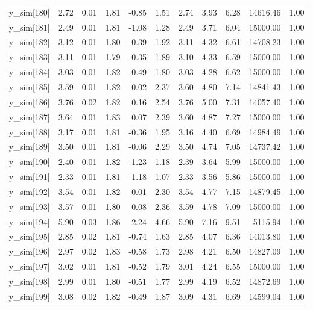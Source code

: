 \begin{table}[ht]
\begin{tabular}{rrrrrrrrrrr}
  y\_sim[180] & 2.72 & 0.01 & 1.81 & -0.85 & 1.51 & 2.74 & 3.93 & 6.28 & 14616.46 & 1.00 \\ 
  y\_sim[181] & 2.49 & 0.01 & 1.81 & -1.08 & 1.28 & 2.49 & 3.71 & 6.04 & 15000.00 & 1.00 \\ 
  y\_sim[182] & 3.12 & 0.01 & 1.80 & -0.39 & 1.92 & 3.11 & 4.32 & 6.61 & 14708.23 & 1.00 \\ 
  y\_sim[183] & 3.11 & 0.01 & 1.79 & -0.35 & 1.89 & 3.10 & 4.33 & 6.59 & 15000.00 & 1.00 \\ 
  y\_sim[184] & 3.03 & 0.01 & 1.82 & -0.49 & 1.80 & 3.03 & 4.28 & 6.62 & 15000.00 & 1.00 \\ 
  y\_sim[185] & 3.59 & 0.01 & 1.82 & 0.02 & 2.37 & 3.60 & 4.80 & 7.14 & 14841.43 & 1.00 \\ 
  y\_sim[186] & 3.76 & 0.02 & 1.82 & 0.16 & 2.54 & 3.76 & 5.00 & 7.31 & 14057.40 & 1.00 \\ 
  y\_sim[187] & 3.64 & 0.01 & 1.83 & 0.07 & 2.39 & 3.60 & 4.87 & 7.27 & 15000.00 & 1.00 \\ 
  y\_sim[188] & 3.17 & 0.01 & 1.81 & -0.36 & 1.95 & 3.16 & 4.40 & 6.69 & 14984.49 & 1.00 \\ 
  y\_sim[189] & 3.50 & 0.01 & 1.81 & -0.06 & 2.29 & 3.50 & 4.74 & 7.05 & 14737.42 & 1.00 \\ 
  y\_sim[190] & 2.40 & 0.01 & 1.82 & -1.23 & 1.18 & 2.39 & 3.64 & 5.99 & 15000.00 & 1.00 \\ 
  y\_sim[191] & 2.33 & 0.01 & 1.81 & -1.18 & 1.07 & 2.33 & 3.56 & 5.86 & 15000.00 & 1.00 \\ 
  y\_sim[192] & 3.54 & 0.01 & 1.82 & 0.01 & 2.30 & 3.54 & 4.77 & 7.15 & 14879.45 & 1.00 \\ 
  y\_sim[193] & 3.57 & 0.01 & 1.80 & 0.08 & 2.36 & 3.59 & 4.78 & 7.09 & 15000.00 & 1.00 \\ 
  y\_sim[194] & 5.90 & 0.03 & 1.86 & 2.24 & 4.66 & 5.90 & 7.16 & 9.51 & 5115.94 & 1.00 \\ 
  y\_sim[195] & 2.85 & 0.02 & 1.81 & -0.74 & 1.63 & 2.85 & 4.07 & 6.36 & 14013.80 & 1.00 \\ 
  y\_sim[196] & 2.97 & 0.02 & 1.83 & -0.58 & 1.73 & 2.98 & 4.21 & 6.50 & 14827.09 & 1.00 \\ 
  y\_sim[197] & 3.02 & 0.01 & 1.81 & -0.52 & 1.79 & 3.01 & 4.24 & 6.55 & 15000.00 & 1.00 \\ 
  y\_sim[198] & 2.99 & 0.01 & 1.80 & -0.51 & 1.77 & 2.99 & 4.19 & 6.52 & 14872.69 & 1.00 \\ 
  y\_sim[199] & 3.08 & 0.02 & 1.82 & -0.49 & 1.87 & 3.09 & 4.31 & 6.69 & 14599.04 & 1.00 \\ 

\end{tabular}
\end{table}
